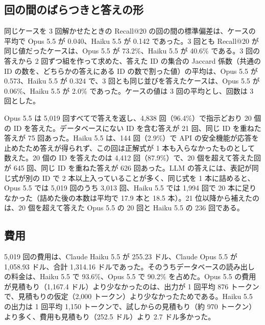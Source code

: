 \documentclass[a4j,dvipdfmx,10pt]{jresume}
\begin{document}
\subsection{回の間のばらつきと答えの形}
同じケースを 3 回解かせたときの Recall@20 の回の間の標準偏差は、ケースの平均で Opus 5.5 が 0.040、Haiku 5.5 が 0.142 であった。3 回とも Recall@20 が同じ値だったケースは、Opus 5.5 が 73.2\%、Haiku 5.5 が 40.6\% である。3 回の答えから 2 回ずつ組を作って求めた、答えた ID の集合の Jaccard 係数（共通の ID の数を、どちらかの答えにある ID の数で割った値）の平均は、Opus 5.5 が 0.573、Haiku 5.5 が 0.324 で、3 回とも同じ並びを答えたケースは、Opus 5.5 が 0.06\%、Haiku 5.5 が 2.0\% であった。ケースの値は 3 回の平均とし、回数は 3 回とした。

Opus 5.5 は 5{,}019 回すべてで答えを返し、4{,}838 回（96.4\%）で指示どおり 20 個の ID を答えた。データベースにない ID を含む答えが 21 回、同じ ID を重ねた答えが 75 回あった。Haiku 5.5 は、144 回（2.9\%）で API の安全機能が応答を止めたため答えが得られず、この回は正解式が 1 本も入らなかったものとして数えた。20 個の ID を答えたのは 4{,}412 回（87.9\%）で、20 個を超えて答えた回が 645 回、同じ ID を重ねた答えが 626 回あった。LLM の答えには、表記が同じ式が別の ID で 2 本以上入っていることが多く、同じ式を 1 本に詰めると、Opus 5.5 では 5{,}019 回のうち 3{,}013 回、Haiku 5.5 では 1{,}994 回で 20 本に足りなかった（詰めた後の本数は平均で 17.9 本と 18.5 本）。21 位以降から補えたのは、20 個を超えて答えた Opus 5.5 の 20 回と Haiku 5.5 の 236 回である。

\subsection{費用}
5{,}019 回の費用は、Claude Haiku 5.5 が 255.23 ドル、Claude Opus 5.5 が 1{,}058.93 ドル、合計 1{,}314.16 ドルであった。そのうちデータベースの読み出しの料金は、Haiku 5.5 で 93.6\%、Opus 5.5 で 90.2\% を占めた。Opus 5.5 の費用が見積もり（1{,}167.4 ドル）より少なかったのは、出力が 1 回平均 876 トークンで、見積もりの仮定（2{,}000 トークン）より少なかったためである。Haiku 5.5 の出力は 1 回平均 1{,}150 トークンで、試しからの見積もり（約 970 トークン）より多く、費用も見積もり（252.5 ドル）より 2.7 ドル多かった。
\end{document}
